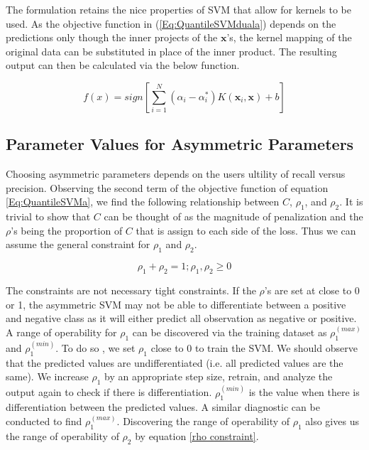 \documentclass[twoside,11pt]{article}
\begin{document}
The formulation retains the nice properties of SVM that allow for kernels to be used. As the objective function in (\ref{Eq:QuantileSVMduala}) depends on the predictions only though the inner projects of the $\mathbf{x}$'s, the kernel mapping of the original data can be substituted in place of the inner product. The resulting output can then be calculated via the below function. 

\begin{equation}\label{finalpredictioneqn2}
f(x)=sign[\displaystyle\sum_{i=1}^N (\alpha_i - \alpha_i^*)K(\mathbf{x}_i,\mathbf{x})+b]
\end{equation}

\subsection{Parameter Values for Asymmetric Parameters}
Choosing asymmetric parameters depends on the users ultility of recall versus precision. Observing the second term of the objective function of equation \ref{Eq:QuantileSVMa}, we find the following relationship between $C$, $\rho_1$, and $\rho_2$. It is trivial to show that $C$ can be thought of as the magnitude of penalization and the $\rho$'s being the proportion of $C$ that is assign to each side of the loss. Thus we can assume the general constraint for $\rho_1$ and $\rho_2$.

\begin{equation}\label{rho constraint}
\rho_1 + \rho_2 =1; \rho_1,\rho_2 \geq 0
\end{equation}

The constraints are not necessary tight constraints. If the $\rho$'s are set at close to 0 or 1, the asymmetric SVM may not be able to differentiate between a positive and negative class as it will either predict all observation as negative or positive. A range of operability for $\rho_1$ can be discovered via the training dataset as $\rho_1^{(max)}$ and $\rho_1^{(min)}$. To do so , we set $\rho_1$ close to 0 to train the SVM. We should observe that the predicted values are undifferentiated (i.e. all predicted values are the same). We increase $\rho_1$ by an appropriate step size, retrain, and analyze the output again to check if there is differentiation. $\rho_1^{(min)}$ is the value when there is differentiation between the predicted values. A similar diagnostic can be conducted to find $\rho_1^{(max)}$. Discovering the range of operability of $\rho_1$ also gives us the range of operability of $\rho_2$ by equation \ref{rho constraint}.
\end{document}

